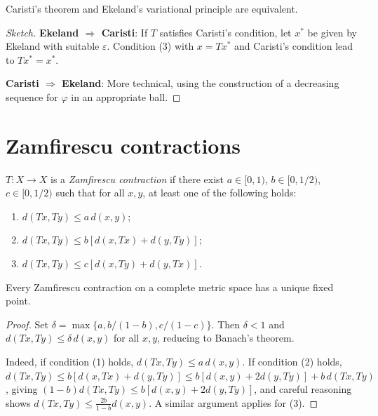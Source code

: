 \begin{proposition}
Caristi's theorem and Ekeland's variational principle are equivalent.
\end{proposition}

\begin{proof}[Sketch]
\textbf{Ekeland $\Rightarrow$ Caristi}: If $T$ satisfies Caristi's condition,
let $x^*$ be given by Ekeland with suitable $\varepsilon$. Condition (3) with
$x = Tx^*$ and Caristi's condition lead to $Tx^* = x^*$.

\textbf{Caristi $\Rightarrow$ Ekeland}: More technical, using the construction
of a decreasing sequence for $\varphi$ in an appropriate ball.
\end{proof}

\section{Zamfirescu contractions}

\begin{definition}
$T : X \to X$ is a \emph{Zamfirescu contraction} if there exist
$a \in [0,1)$, $b \in [0, 1/2)$, $c \in [0, 1/2)$ such that for all $x, y$,
at least one of the following holds:
\begin{enumerate}
    \item $d(Tx, Ty) \leq a \, d(x, y)$;
    \item $d(Tx, Ty) \leq b[d(x, Tx) + d(y, Ty)]$;
    \item $d(Tx, Ty) \leq c[d(x, Ty) + d(y, Tx)]$.
\end{enumerate}
\end{definition}

\begin{theorem}[Zamfirescu, 1972]
Every Zamfirescu contraction on a complete metric space has a unique fixed point.
\end{theorem}

\begin{proof}
Set $\delta = \max\{a, b/(1-b), c/(1-c)\}$. Then $\delta < 1$ and
$d(Tx, Ty) \leq \delta \, d(x,y)$ for all $x, y$, reducing to Banach's theorem.

Indeed, if condition (1) holds, $d(Tx,Ty) \leq a \, d(x,y)$. If condition (2)
holds, $d(Tx,Ty) \leq b[d(x,Tx) + d(y,Ty)] \leq b[d(x,y) + 2d(y, Ty)] + b \, d(Tx, Ty)$,
giving $(1-b) d(Tx,Ty) \leq b[d(x,y) + 2d(y,Ty)]$, and careful reasoning shows
$d(Tx,Ty) \leq \frac{2b}{1-b} d(x,y)$. A similar argument applies for (3).
\end{proof}

